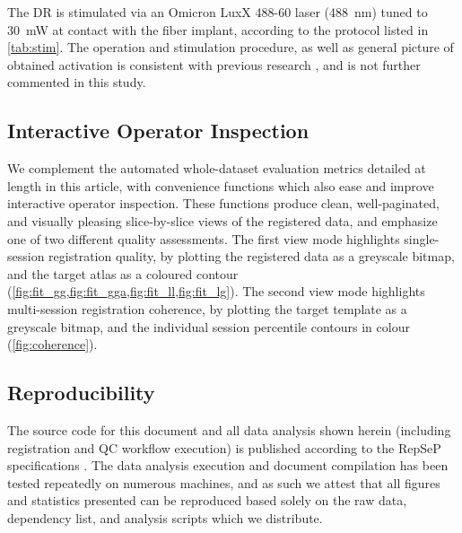 The DR is stimulated via an Omicron LuxX 488-60 laser (\SI{488}{\nano\meter}) tuned to \SI{30}{\milli\watt} at contact with the fiber implant, according to the protocol listed in \cref{tab:stim}.
The operation and stimulation procedure, as well as general picture of obtained activation is consistent with previous research \cite{Grandjean2019}, and is not further commented in this study.

\subsection{Interactive Operator Inspection}

We complement the automated whole-dataset evaluation metrics detailed at length in this article, with convenience functions which also ease and improve interactive operator inspection.
These functions produce clean, well-paginated, and visually pleasing slice-by-slice views of the registered data, and emphasize one of two different quality assessments.
The first view mode highlights single-session registration quality, by plotting the registered data as a greyscale bitmap, and the target atlas as a coloured contour (\cref{fig:fit_gg,fig:fit_gga,fig:fit_ll,fig:fit_lg}).
The second view mode highlights multi-session registration coherence, by plotting the target template as a greyscale bitmap, and the individual session percentile contours in colour (\cref{fig:coherence}).

\subsection{Reproducibility}

The source code for this document and all data analysis shown herein (including registration and QC workflow execution) is published according to the RepSeP specifications \cite{repsep}.
The data analysis execution and document compilation has been tested repeatedly on numerous machines, and as such we attest that all figures and statistics presented can be reproduced based solely on the raw data, dependency list, and analysis scripts which we distribute.
